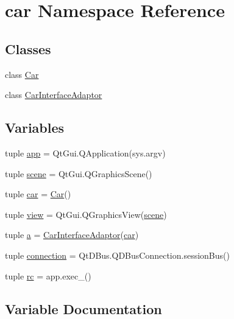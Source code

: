 \hypertarget{namespacecar}{}\section{car Namespace Reference}
\label{namespacecar}
\subsection*{Classes}
\begin{DoxyCompactItemize}
\item 
class \hyperlink{classcar_1_1Car}{Car}
\item 
class \hyperlink{classcar_1_1CarInterfaceAdaptor}{Car\+Interface\+Adaptor}
\end{DoxyCompactItemize}
\subsection*{Variables}
\begin{DoxyCompactItemize}
\item 
tuple \hyperlink{namespacecar_ad1575dce72102f4a38ea6b1db9346b45}{app} = Qt\+Gui.\+Q\+Application(sys.\+argv)
\item 
tuple \hyperlink{namespacecar_af5c042696c68ad4d60a1862fce028f6f}{scene} = Qt\+Gui.\+Q\+Graphics\+Scene()
\item 
tuple \hyperlink{namespacecar_a861dfca53f70d7bbb7f78412d282eaa3}{car} = \hyperlink{classcar_1_1Car}{Car}()
\item 
tuple \hyperlink{namespacecar_a5c086010f30a84ce6a0bc9f610e50411}{view} = Qt\+Gui.\+Q\+Graphics\+View(\hyperlink{namespacecar_af5c042696c68ad4d60a1862fce028f6f}{scene})
\item 
tuple \hyperlink{namespacecar_ad7d6f676ff88010ad4be246489079649}{a} = \hyperlink{classcar_1_1CarInterfaceAdaptor}{Car\+Interface\+Adaptor}(\hyperlink{namespacecar_a861dfca53f70d7bbb7f78412d282eaa3}{car})
\item 
tuple \hyperlink{namespacecar_a6dac8cb18ae2723dcdbd8a2f0a981ac5}{connection} = Qt\+D\+Bus.\+Q\+D\+Bus\+Connection.\+session\+Bus()
\item 
tuple \hyperlink{namespacecar_a6251bd0e65bcf66f4a0f679efe8d5f86}{rc} = app.\+exec\+\_\+()
\end{DoxyCompactItemize}


\subsection{Variable Documentation}
\hypertarget{namespacecar_ad7d6f676ff88010ad4be246489079649}{}

